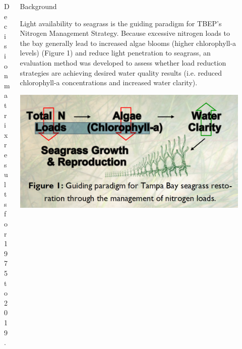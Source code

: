 \documentclass[final,t]{beamer}\usepackage[]{graphicx}\usepackage[]{color}
\begin{document}
\begin{frame}
\begin{columns}[t]
\begin{column}{.32\linewidth}
\begin{figure}
\caption{\footnotesize Decision matrix results for 1975 to 2019.}
\label{fig:attainmat}
\end{figure}

\end{column}

\begin{column}{.63\linewidth}

\begin{block}{Background}
\begin{minipage}{0.5\textwidth}
\scriptsize
Light availability to seagrass is the guiding paradigm for TBEP's Nitrogen Management Strategy. Because excessive nitrogen loads to the bay generally lead to increased algae blooms (higher chlorophyll-a levels) (Figure 1) and reduce light penetration to seagrass, an evaluation method was developed to assess whether load reduction strategies are achieving desired water quality results (i.e. reduced chlorophyll-a concentrations and increased water clarity). 
\end{minipage}
\hspace{0.01in}
\begin{minipage}{0.45\textwidth}
\includegraphics[width=\textwidth]{www/nitro.PNG}
\end{minipage}
\end{block}


\end{column}
\end{columns}
\end{frame}
\end{document}
